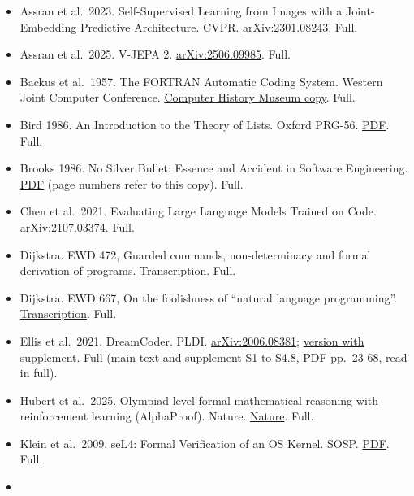\documentclass[10pt,letterpaper]{article}
\providecommand{\tightlist}{\setlength{\itemsep}{1pt}\setlength{\parskip}{0pt}}
\begin{document}
\begin{itemize}
\tightlist
\item
  Assran et al.~2023. Self-Supervised Learning from Images with a
  Joint-Embedding Predictive Architecture. CVPR.
  \href{https://arxiv.org/abs/2301.08243}{arXiv:2301.08243}. Full.
\item
  Assran et al.~2025. V-JEPA 2.
  \href{https://arxiv.org/abs/2506.09985}{arXiv:2506.09985}. Full.
\item
  Backus et al.~1957. The FORTRAN Automatic Coding System. Western Joint
  Computer Conference.
  \href{https://archive.computerhistory.org/resources/text/Fortran/102663113.05.01.acc.pdf}{Computer
  History Museum copy}. Full.
\item
  Bird 1986. An Introduction to the Theory of Lists. Oxford PRG-56.
  \href{https://www.cs.ox.ac.uk/files/3378/PRG56.pdf}{PDF}. Full.
\item
  Brooks 1986. No Silver Bullet: Essence and Accident in Software
  Engineering.
  \href{https://worrydream.com/refs/Brooks_1986_-_No_Silver_Bullet.pdf}{PDF}
  (page numbers refer to this copy). Full.
\item
  Chen et al.~2021. Evaluating Large Language Models Trained on Code.
  \href{https://arxiv.org/abs/2107.03374}{arXiv:2107.03374}. Full.
\item
  Dijkstra. EWD 472, Guarded commands, non-determinacy and formal
  derivation of programs.
  \href{https://www.cs.utexas.edu/~EWD/transcriptions/EWD04xx/EWD472.html}{Transcription}.
  Full.
\item
  Dijkstra. EWD 667, On the foolishness of ``natural language
  programming''.
  \href{https://www.cs.utexas.edu/~EWD/transcriptions/EWD06xx/EWD667.html}{Transcription}.
  Full.
\item
  Ellis et al.~2021. DreamCoder. PLDI.
  \href{https://arxiv.org/abs/2006.08381}{arXiv:2006.08381};
  \href{https://www.cs.cornell.edu/~ellisk/documents/dreamcoder_with_supplement.pdf}{version
  with supplement}. Full (main text and supplement S1 to S4.8, PDF
  pp.~23-68, read in full).
\item
  Hubert et al.~2025. Olympiad-level formal mathematical reasoning with
  reinforcement learning (AlphaProof). Nature.
  \href{https://www.nature.com/articles/s41586-025-09833-y}{Nature}.
  Full.
\item
  Klein et al.~2009. seL4: Formal Verification of an OS Kernel. SOSP.
  \href{https://www.sigops.org/s/conferences/sosp/2009/papers/klein-sosp09.pdf}{PDF}.
  Full.
\item

\end{itemize}
\end{document}
